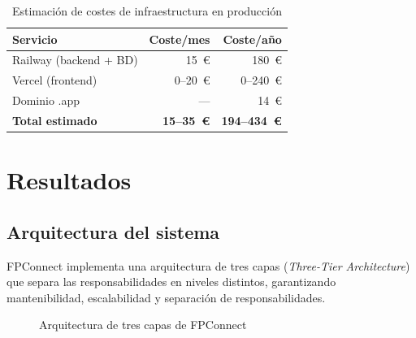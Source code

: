 \documentclass[a4paper]{report}
\begin{document}
\begin{table}[H]
  \centering
  \begin{tabular}{lrr}
    \toprule
    \textbf{Servicio} & \textbf{Coste/mes} & \textbf{Coste/año} \\
    \midrule
    Railway (backend + BD) & 15~€ & 180~€ \\
    Vercel (frontend)      & 0--20~€ & 0--240~€ \\
    Dominio .app           & ---  & 14~€ \\
    \midrule
    \textbf{Total estimado} & \textbf{15--35~€} & \textbf{194--434~€} \\
    \bottomrule
  \end{tabular}
  \caption{Estimación de costes de infraestructura en producción}
\end{table}

\newpage

\chapter{Resultados}

\section{Arquitectura del sistema}

FPConnect implementa una arquitectura de tres capas (\textit{Three-Tier Architecture}) que separa las responsabilidades en niveles distintos, garantizando mantenibilidad, escalabilidad y separación de responsabilidades.

\begin{figure}[H]
\centering
{}
\caption{Arquitectura de tres capas de FPConnect}
\end{figure}
\end{document}
